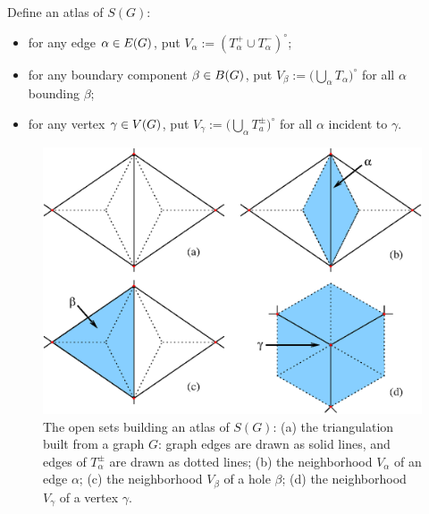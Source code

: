 Define an atlas of $S(G)$:
\begin{itemize}
\item for any edge $\alpha \in E(G)$, put $V_\alpha := (T_\alpha^+ \cup T_\alpha^-)^\circ$;
\item for any boundary component $\beta \in B(G)$, put $V_\beta := \bigl(
  \bigcup_{\alpha} T_\alpha \bigr)^\circ$ for all $\alpha$ bounding $\beta$;
\item for any vertex $\gamma \in V(G)$, put $V_\gamma := \bigl( \bigcup_\alpha T_a^\pm
  \bigr)^\circ$ for all $\alpha$ incident to $\gamma$.
\end{itemize}
\begin{figure}[btp]
  \centering\includegraphics[width=\textwidth]{atlas}
  \caption{The open sets building an atlas of $S(G)$: (a) the
    triangulation built from a graph $G$: graph edges are drawn as
    solid lines, and edges of $T_\alpha^{\pm}$ are drawn as dotted lines; (b)
    the neighborhood $V_\alpha$ of an edge $\alpha$; (c) the neighborhood $V_\beta$
    of a hole $\beta$; (d) the neighborhood $V_\gamma$ of a vertex $\gamma$.}
  \label{fig:atlas}
\end{figure}


